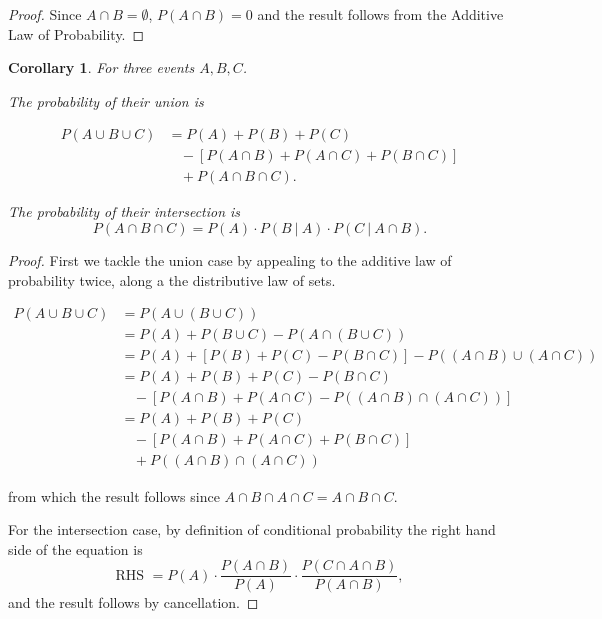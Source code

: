 \documentclass[
]{book}
\newtheorem{corollary}{Corollary}[chapter]
\theoremstyle{definition}
\theoremstyle{definition}
\theoremstyle{definition}
\theoremstyle{definition}
\theoremstyle{remark}
\begin{document}
\begin{proof}
Since \(A\cap B = \emptyset\), \(P(A \cap B) = 0\) and the result follows from the Additive Law of Probability.
\end{proof}

\begin{corollary}
For three events \(A, B, C\).

The probability of their union is

\begin{align*}
P(A \cup B \cup C) &= P(A)+P(B)+P(C)\\
                   &~~~~ - [P(A\cap B) + P(A \cap C) + P(B \cap C)]\\
                   &~~~~ + P(A \cap B \cap C).
\end{align*}

The probability of their intersection is
\[P(A \cap B \cap C) = P(A) \cdot P(B~|~A) \cdot P(C ~|~ A \cap B).\]
\end{corollary}

\begin{proof}
First we tackle the union case by appealing to the additive law of probability twice, along a the distributive law of sets.

\begin{align*}
P(A \cup B \cup C) &= P(A \cup (B \cup C)) \\
                   &= P(A) + P(B \cup C) - P(A \cap (B \cup C)) \\
                   &= P(A) + [P(B) + P(C)- P(B \cap C)] - P((A\cap B) \cup (A \cap C)) \\
                   &= P(A) + P(B) + P(C) - P(B \cap C) \\
                   &~~~~ - [P(A \cap B)+ P(A \cap C)-P((A \cap B) \cap (A \cap C))]\\
                   &= P(A) + P(B) + P(C) \\
                   &~~~~ - [P(A\cap B) + P(A \cap C) + P(B \cap C)] \\
                   &~~~~ + P((A \cap B) \cap (A \cap C))
\end{align*}

from which the result follows since \(A \cap B \cap A \cap C = A \cap B \cap C\).

For the intersection case, by definition of conditional probability the right hand side of the equation is
\[\text{RHS } = P(A) \cdot \frac{P(A \cap B)}{P(A)} \cdot \frac{P(C\cap A\cap B)}{P(A \cap B)},\] and the result follows by cancellation.
\end{proof}
\end{document}
